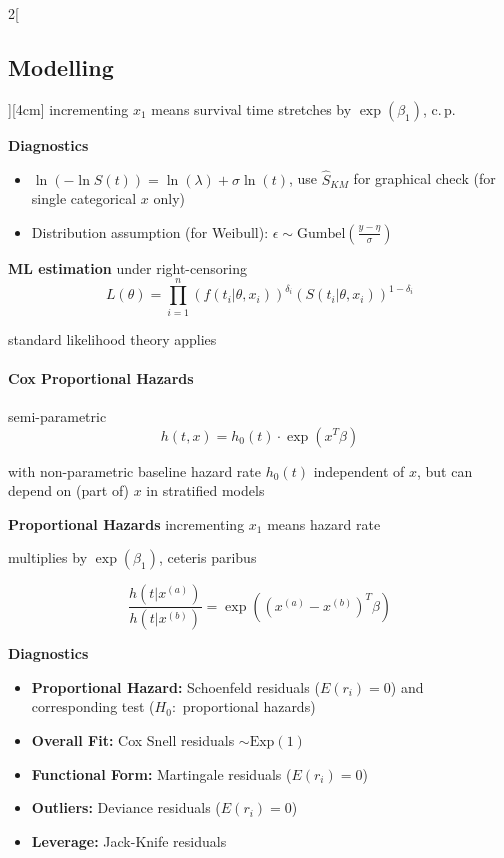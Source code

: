 \documentclass[8pt]{extarticle}
\begin{document}
\begin{multicols}{2}[\subsection{Modelling}][4cm]
\noindent incrementing $x_1$ means survival time stretches by $\exp(\beta_{1})$, c.\,p.

\vspace{0.3em}
\textbf{Diagnostics}\vspace{-0.3em}
\begin{itemize}[itemsep=-0.5em]
\item $\ln(-\ln S(t)) = \ln(\lambda) + \sigma\ln(t)$, use $\hat{S}_{KM}$ for graphical check (for single categorical $x$ only)
\item Distribution assumption (for Weibull): $\epsilon \sim \mathrm{Gumbel}\left(\frac{y-\eta}{\sigma}\right)$
\end{itemize} 

\vspace{0.3em}
\textbf{ML estimation} under right-censoring \vspace{-0.3em}
$$L(\theta) = \prod_{i=1}^n \left(f(t_i|\theta,x_i)\right)^{\delta_i} \left(S(t_i|\theta,x_i)\right)^{1-\delta_i}$$

standard likelihood theory applies

\paragraph{Cox Proportional Hazards} semi-parametric
$$h(t,x) = h_0(t) \cdot\exp (x^T\beta)$$

\noindent with non-parametric baseline hazard rate $h_0(t)$ independent of $x$, but can depend on (part of) $x$ in stratified models

\vspace{0.3em}

\textbf{Proportional Hazards}
incrementing $x_1$ means hazard rate 

multiplies by $\exp(\beta_{1})$, ceteris paribus
\begin{Proof}
\vspace{-2.7em}
$$\frac{h(t|x^{(a)})}{h(t|x^{(b)})} = \exp((x^{(a)}-x^{(b)})^T\beta)$$
\end{Proof}

\textbf{Diagnostics}
\begin{itemize}[itemsep=-0.5em]
\item \textbf{Proportional Hazard:} Schoenfeld residuals ($E(r_i)=0$) and corresponding  test ($H_0:$ proportional hazards)
\item \textbf{Overall Fit:} Cox Snell residuals $\sim \mathrm{Exp}(1)$
\item \textbf{Functional Form:} Martingale residuals ($E(r_i)=0$)
\item \textbf{Outliers:} Deviance residuals ($E(r_i)=0$)
\item \textbf{Leverage:} Jack-Knife residuals
\end{itemize}


\end{multicols}
\end{document}
